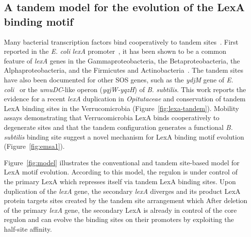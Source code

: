 \subsection{A tandem model for the evolution of the LexA binding motif}

Many bacterial transcription factors bind cooperatively to tandem
sites~\cite{barnard2004regulation}. First reported in the \textit{E. coli}
\textit{lexA} promoter~\cite{brent1982regulation}, it has been shown to be a
common feature of \textit{lexA} genes in the Gammaproteobacteria, the
Betaproteobacteria, the Alphaproteobacteria, and the Firmicutes and
Actinobacteria~\cite{sanchez2012analysis, cornish2012inference}. The tandem
sites have also been documented for other SOS genes, such as the \textit{ydjM}
gene of \textit{E. coli}~\cite{fernandez2000identification} or the
\textit{umuDC}-like operon (\textit{yqjW-yqzH}) of
\textit{B. subtilis}\cite{au2005genetic}. This work reports the evidence for a
recent \textit{lexA} duplication in \textit{Opitutaceae} and conservation of
tandem LexA binding sites in the Verrucomicrobia
(Figure~\ref{fig:lexa-tandem}). Mobility assays demonstrating that
Verrucomicrobia LexA binds cooperatively to degenerate sites and that the
tandem configuration generates a functional \textit{B. subtilis} binding site
suggest a novel mechanism for LexA binding motif evolution
(Figure~\ref{fig:emsa1}).

Figure~\ref{fig:model} illustrates the conventional and tandem site-based model
for LexA motif evolution. According to this model, the regulon is under control
of the primary LexA which represses itself via tandem LexA binding sites. Upon
duplication of the \textit{lexA} gene, the secondary \textit{lexA} diverges and
its product LexA protein targets sites created by the tandem site arrangement
which After deletion of the primary \textit{lexA} gene, the secondary LexA is
already in control of the core regulon and can evolve the binding sites on
their promoters by exploiting the half-site affinity.

